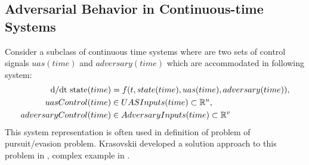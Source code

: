 \subsection{Adversarial Behavior in Continuous-time Systems}
\noindent Consider a subclass of continuous time systems where are two sets of control signals $uas(time)$ and $adversary(time)$ which are accommodated in following system:
\begin{equation}\label{eq:Adversarial}
    \begin{aligned}
    \text{d} / \text{d} \text{t state}(time)&= f(t,state(time),uas(time),adversary(time)), \\
    uasControl(time) &\in UAS Inputs(time) \subset \mathbb{R}^u, \\
    adversaryControl(time) &\in Adversary Inputs(time) \subset \mathbb{R}^v \\
    \end{aligned}
\end{equation}
This system representation is often used in definition of problem of pursuit/evasion problem. Krasovskii developed a solution approach to this problem in \cite{game1987}, complex example in \cite{game1988}.